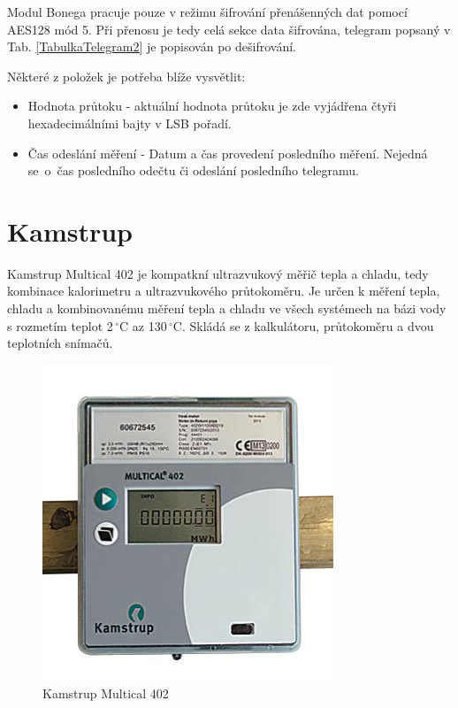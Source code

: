 \newpage{}

Modul Bonega pracuje pouze v režimu šifrování přenášenných dat pomocí AES128 mód 5. Při přenosu je tedy celá sekce data šifrována, telegram popsaný v Tab. \ref{TabulkaTelegram2} je popisován po dešifrování.

Některé z položek je potřeba blíže vysvětlit:

\begin{itemize}
	\item Hodnota průtoku - aktuální hodnota průtoku je zde vyjádřena čtyři hexadecimálními bajty v LSB pořadí.
	\item Čas odeslání měření - Datum a čas provedení posledního měření. Nejedná se~o~čas posledního odečtu či odeslání posledního telegramu.
\end{itemize}



	
	\section{Kamstrup}
	
	Kamstrup Multical 402 je kompatkní ultrazvukový měřič tepla a chladu, tedy kombinace kalorimetru a ultrazvukového průtokoměru. Je určen k měření tepla, chladu a kombinovanému měření tepla a chladu ve všech systémech na bázi vody s rozmetím teplot 2\,$^{\circ}$C az 130\,$^{\circ}$C. Skládá se z kalkulátoru, průtokoměru a dvou teplotních snímačů. 
	
 \begin{figure}[!ht]
\vspace{-20pt}
  \begin{center}
    \includegraphics[scale=0.7]{obrazky/zarizeni_kamstrup}
  \end{center}
	\vspace{-30pt}
  \caption{Kamstrup Multical 402~\cite{CidloKamstrup}}
	\vspace{-20pt}
\end{figure}
	
